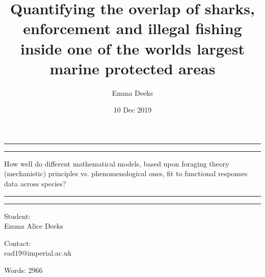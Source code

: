 \documentclass[11pt]{article}
\title {Quantifying the overlap of sharks, enforcement and illegal fishing inside one of the worlds largest marine protected areas}
\author{Emma Deeks}
\date{10 Dec 2019}
\begin{document}
	
	\begin{titlepage}
		
		
		\centering %
		
		
		
		
		
		\vspace*{5\baselineskip}
		
		\rule{\textwidth}{1.6pt}\vspace*{-\baselineskip}\vspace*{2pt} %
		\rule{\textwidth}{0.4pt} %
		
		\vspace{0.75\baselineskip} %
		
		{\LARGE How well do different mathematical models, based upon foraging theory (mechanistic) principles vs. phenomenological ones, fit to functional responses data across species? \\} 
		
		\vspace{0.75\baselineskip} %
		
		\rule{\textwidth}{0.4pt}\vspace*{-\baselineskip}\vspace{3.2pt} 
		\rule{\textwidth}{1.6pt} 
		
		\vspace{2\baselineskip} 
		

Student: \\
Emma Alice Deeks \\ 
	
		\vspace{1.5 \baselineskip} %
		
		Contact: \\
		ead19@imperial.ac.uk\\
		
			\vspace{1.5 \baselineskip} %
			
		Words: 2966
		

	\end{titlepage}
	
	\linenumbers
	\doublespacing
\end{document}

